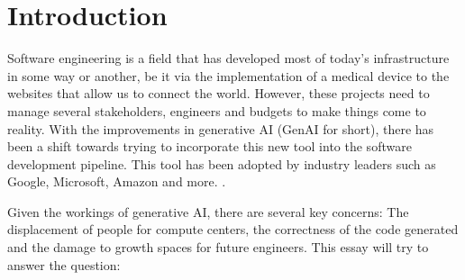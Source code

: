 \section{Introduction}
Software engineering is a field that has developed most of today's infrastructure in some way or another, be it via the implementation of a medical device to the websites that allow us to connect the world. However, these projects need to manage several stakeholders, engineers and budgets to make things come to reality. With the improvements in generative AI (GenAI for short), there has been a shift towards trying to incorporate this new tool into the software development pipeline. This tool has been adopted by industry leaders such as Google, Microsoft, Amazon and more. \cite{microsoft-ai-future, google-ai-use, amazon-ai-layoffs}.

Given the workings of generative AI, there are several key concerns: The displacement of people for compute centers, the correctness of the code generated and the damage to growth spaces for future engineers. This essay will try to answer the question:


